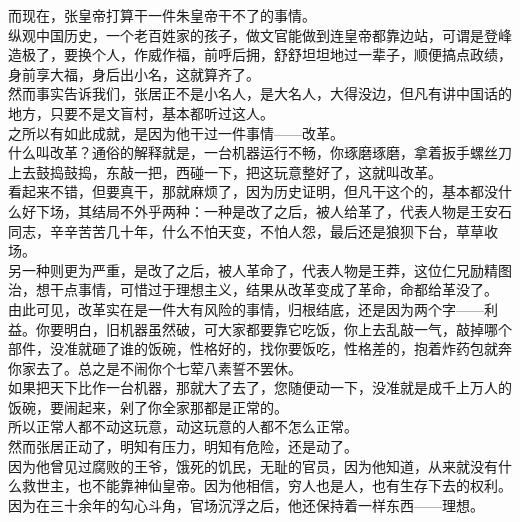 \begin{multicols}{\theparacolNo}
而现在，张皇帝打算干一件朱皇帝干不了的事情。\\

纵观中国历史，一个老百姓家的孩子，做文官能做到连皇帝都靠边站，可谓是登峰造极了，要换个人，作威作福，前呼后拥，舒舒坦坦地过一辈子，顺便搞点政绩，身前享大福，身后出小名，这就算齐了。\\

然而事实告诉我们，张居正不是小名人，是大名人，大得没边，但凡有讲中国话的地方，只要不是文盲村，基本都听过这人。\\

之所以有如此成就，是因为他干过一件事情——改革。\\

什么叫改革？通俗的解释就是，一台机器运行不畅，你琢磨琢磨，拿着扳手螺丝刀上去鼓捣鼓捣，东敲一把，西碰一下，把这玩意整好了，这就叫改革。\\

看起来不错，但要真干，那就麻烦了，因为历史证明，但凡干这个的，基本都没什么好下场，其结局不外乎两种：一种是改了之后，被人给革了，代表人物是王安石同志，辛辛苦苦几十年，什么不怕天变，不怕人怨，最后还是狼狈下台，草草收场。\\

另一种则更为严重，是改了之后，被人革命了，代表人物是王莽，这位仁兄励精图治，想干点事情，可惜过于理想主义，结果从改革变成了革命，命都给革没了。\\

由此可见，改革实在是一件大有风险的事情，归根结底，还是因为两个字——利益。你要明白，旧机器虽然破，可大家都要靠它吃饭，你上去乱敲一气，敲掉哪个部件，没准就砸了谁的饭碗，性格好的，找你要饭吃，性格差的，抱着炸药包就奔你家去了。总之是不闹你个七荤八素誓不罢休。\\

如果把天下比作一台机器，那就大了去了，您随便动一下，没准就是成千上万人的饭碗，要闹起来，剁了你全家那都是正常的。\\

所以正常人都不动这玩意，动这玩意的人都不怎么正常。\\

然而张居正动了，明知有压力，明知有危险，还是动了。\\

因为他曾见过腐败的王爷，饿死的饥民，无耻的官员，因为他知道，从来就没有什么救世主，也不能靠神仙皇帝。因为他相信，穷人也是人，也有生存下去的权利。\\

因为在三十余年的勾心斗角，官场沉浮之后，他还保持着一样东西——理想。\\


\end{multicols}
